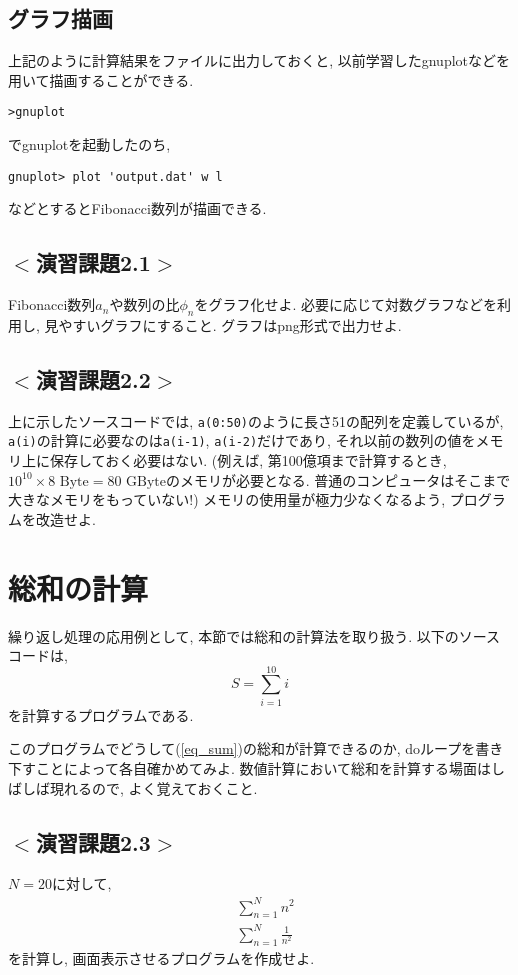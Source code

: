 \subsection*{グラフ描画}
上記のように計算結果をファイルに出力しておくと, 以前学習したgnuplotなどを用いて描画することができる.
\begin{Verbatim}[frame=single]
>gnuplot
\end{Verbatim}
でgnuplotを起動したのち,
\begin{Verbatim}[frame=single]
gnuplot> plot 'output.dat' w l
\end{Verbatim}
などとするとFibonacci数列が描画できる.

\subsection*{$<$演習課題2.1$>$}
Fibonacci数列$a_n$や数列の比$\phi_n$をグラフ化せよ.
必要に応じて対数グラフなどを利用し, 見やすいグラフにすること.
グラフはpng形式で出力せよ.

\subsection*{$<$演習課題2.2$>$}
上に示したソースコードでは, \verb|a(0:50)|のように長さ51の配列を定義しているが,
\verb|a(i)|の計算に必要なのは\verb|a(i-1)|, \verb|a(i-2)|だけであり,
それ以前の数列の値をメモリ上に保存しておく必要はない.
(例えば, 第100億項まで計算するとき, $10^{10} \times 8\mbox{ Byte}=80\mbox{ GByte}$のメモリが必要となる.
普通のコンピュータはそこまで大きなメモリをもっていない!)
メモリの使用量が極力少なくなるよう, プログラムを改造せよ.

\section{総和の計算}
繰り返し処理の応用例として, 本節では総和の計算法を取り扱う.
以下のソースコードは,
\begin{equation}
S=\sum_{i=1}^{10} i
\label{eq_sum}
\end{equation}
を計算するプログラムである.


このプログラムでどうして(\ref{eq_sum})の総和が計算できるのか,
doループを書き下すことによって各自確かめてみよ.
数値計算において総和を計算する場面はしばしば現れるので,
よく覚えておくこと.


\subsection*{$<$演習課題2.3$>$}
$N=20$に対して,
\begin{align}
&\sum_{n=1}^{N} n^2 \\
&\sum_{n=1}^{N} \frac{1}{n^2}
\end{align}
を計算し, 画面表示させるプログラムを作成せよ.

